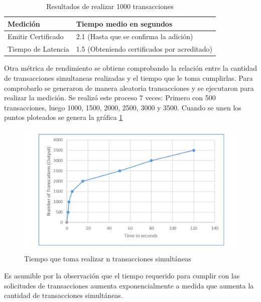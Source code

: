 \begin{table}[!h]
	\caption{Resultados de realizar 1000 transacciones}
	\label{tab:1}
	\begin{tabular}{ll} \toprule
		\textbf{Medición} & \textbf{Tiempo medio en segundos} \\ \midrule
		Emitir Certificado & 2.1 (Hasta que se confirma la adición)  \\
		Tiempo de Latencia & 1.5 (Obteniendo certificados por acreditado)  \\ \bottomrule
	\end{tabular}
\end{table}

Otra métrica de rendimiento se obtiene comprobando la relación entre la cantidad de transacciones simultaneas realizadas y el tiempo que le toma cumplirlas. Para comprobarlo se generaron de manera aleatoria transacciones y se ejecutaron para realizar la medición. Se realizó este proceso 7 veces: Primero con 500 transacciones, luego 1000, 1500, 2000, 2500, 3000 y 3500. Cuando se unen los puntos ploteados se genera la gráfica \ref{fig:13}

\begin{figure}[h!]
	\centering
	\includegraphics[width=\linewidth]{Graphics/plot.png}
	\caption{Tiempo que toma realizar n transacciones simultáneas}
	\label{fig:13}
\end{figure}

Es asumible por la observación que el tiempo requerido para cumplir con las solicitudes de transacciones aumenta exponencialmente a medida que aumenta la cantidad de transacciones simultáneas.

